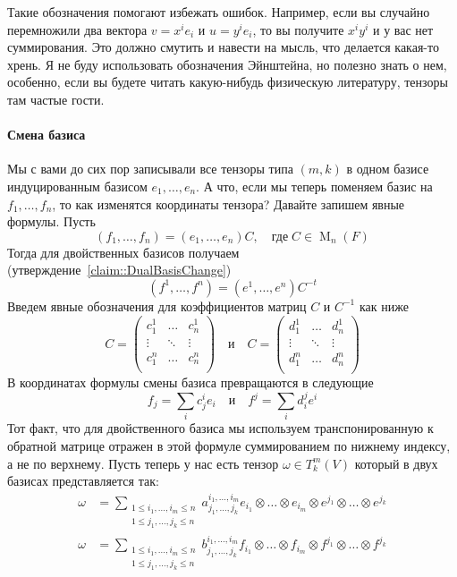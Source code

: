 Такие обозначения помогают избежать ошибок. Например, если вы случайно перемножили два вектора $v = x^i e_i$ и $u = y^i e_i$, то вы получите $x^i y^i$ и у вас нет суммирования. Это должно смутить и  навести на мысль, что делается какая-то хрень. Я не буду использовать обозначения Эйнштейна, но полезно знать о нем, особенно, если вы будете читать какую-нибудь физическую литературу, тензоры там частые гости.

\paragraph{Смена базиса}

Мы с вами до сих пор записывали все тензоры типа $(m,k)$ в одном базисе индуцированным базисом $e_1,\ldots,e_n$. А что, если мы теперь поменяем базис на $f_1,\ldots,f_n$, то как изменятся координаты тензора? Давайте запишем явные формулы. Пусть
\[
(f_1,\ldots,f_n) = (e_1,\ldots,e_n)C,\quad\text{где}\;C\in \operatorname{M}_n(F)
\]
Тогда для двойственных базисов получаем (утверждение~\ref{claim::DualBasisChange})
\[
(f^1,\ldots,f^n) = (e^1,\ldots,e^n)C^{-t}
\]
Введем явные обозначения для коэффициентов матриц $C$ и $C^{-1}$ как ниже
\[
C =
\begin{pmatrix}
{c^1_1}&{\ldots}&{c^1_n}\\
{\vdots}&{\ddots}&{\vdots}\\
{c^n_1}&{\ldots}&{c^n_n}\\
\end{pmatrix}
\quad\text{и}\quad
C =
\begin{pmatrix}
{d^1_1}&{\ldots}&{d^1_n}\\
{\vdots}&{\ddots}&{\vdots}\\
{d^n_1}&{\ldots}&{d^n_n}\\
\end{pmatrix}
\]
В координатах формулы смены базиса превращаются в следующие
\[
f_j = \sum_i c^i_j e_i
\quad\text{и}\quad
f^j = \sum_i d^j_i e^i
\]
Тот факт, что для двойственного базиса мы используем транспонированную к обратной матрице отражен в этой формуле суммированием по нижнему индексу, а не по верхнему. Пусть теперь у нас есть тензор $\omega \in T^m_k(V)$ который в двух базисах представляется так:
\begin{align*}
\omega &= \sum_{\substack{1\leqslant i_1,\ldots,i_m\leqslant n\\1\leqslant j_1,\ldots,j_k\leqslant n}} a^{i_1,\ldots,i_m}_{j_1,\ldots,j_k}e_{i_1}\otimes \ldots \otimes e_{i_m}\otimes e^{j_1}\otimes \ldots \otimes e^{j_k}\\
\omega &= \sum_{\substack{1\leqslant i_1,\ldots,i_m\leqslant n\\1\leqslant j_1,\ldots,j_k\leqslant n}} b^{i_1,\ldots,i_m}_{j_1,\ldots,j_k}f_{i_1}\otimes \ldots \otimes f_{i_m}\otimes f^{j_1}\otimes \ldots \otimes f^{j_k}
\end{align*}
